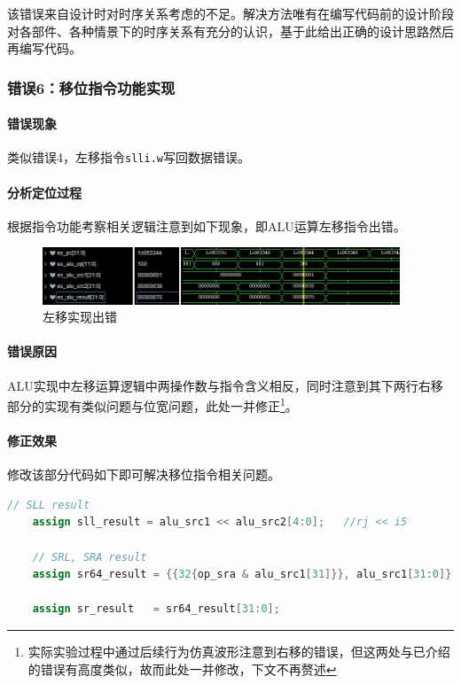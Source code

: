 \documentclass[UTF-8,twoside,c5size]{ctexart}
\begin{document}
	该错误来自设计时对时序关系考虑的不足。解决方法唯有在编写代码前的设计阶段对各部件、各种情景下的时序关系有充分的认识，基于此给出正确的设计思路然后再编写代码。
	
	\subsubsection{错误\textbf{6：}移位指令功能实现}
	
	\paragraph{错误现象}\hfill
	
	类似错误4，左移指令\texttt{slli.w}写回数据错误。
	
	\paragraph{分析定位过程}\hfill
	
	根据指令功能考察相关逻辑注意到如下现象，即ALU运算左移指令出错。
	
	\begin{figure}[!h]
		\centering
		\includegraphics*[width=0.95\textwidth]{03-dbg-06-02.jpg}
		\caption{左移实现出错}
	\end{figure}

	\paragraph{错误原因}\hfill
	
	ALU实现中左移运算逻辑中两操作数与指令含义相反，同时注意到其下两行右移部分的实现有类似问题与位宽问题，此处一并修正\footnote{实际实验过程中通过后续行为仿真波形注意到右移的错误，但这两处与已介绍的错误有高度类似，故而此处一并修改，下文不再赘述}。
	
	\paragraph{修正效果}\hfill
	
	修改该部分代码如下即可解决移位指令相关问题。
	\begin{lstlisting}[language=verilog]
	// SLL result
	assign sll_result = alu_src1 << alu_src2[4:0];   //rj << i5
	
	// SRL, SRA result
	assign sr64_result = {{32{op_sra & alu_src1[31]}}, alu_src1[31:0]} >> alu_src2[4:0]; //rj >> i5
	
	assign sr_result   = sr64_result[31:0];
	\end{lstlisting}
\end{document}
